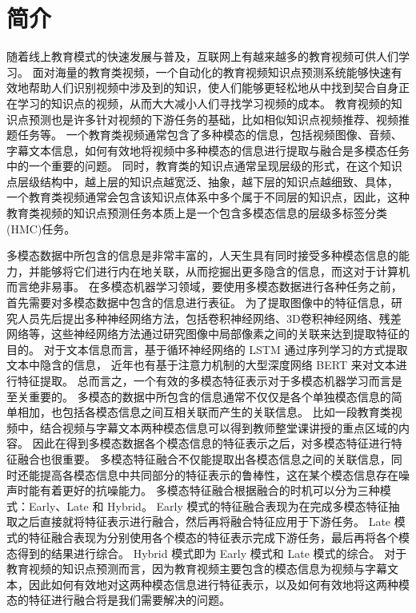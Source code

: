
\chapter{简介}
    随着线上教育模式的快速发展与普及，互联网上有越来越多的教育视频可供人们学习。
    面对海量的教育类视频，一个自动化的教育视频知识点预测系统能够快速有效地帮助人们识别视频中涉及到的知识，使人们能够更轻松地从中找到契合自身正在学习的知识点的视频，从而大大减小人们寻找学习视频的成本。
    教育视频的知识点预测也是许多针对视频的下游任务的基础，比如相似知识点视频推荐、视频推题任务等。
    一个教育类视频通常包含了多种模态的信息，包括视频图像、音频、字幕文本信息，如何有效地将视频中多种模态的信息进行提取与融合是多模态任务中的一个重要的问题。
    同时，教育类的知识点通常呈现层级的形式，在这个知识点层级结构中，越上层的知识点越宽泛、抽象，越下层的知识点越细致、具体，
    一个教育类视频通常会包含该知识点体系中多个属于不同层的知识点，因此，这种教育类视频的知识点预测任务本质上是一个包含多模态信息的层级多标签分类(HMC)任务。

    多模态数据中所包含的信息是非常丰富的，人天生具有同时接受多种模态信息的能力，并能够将它们进行内在地关联，从而挖掘出更多隐含的信息，而这对于计算机而言绝非易事。
    在多模态机器学习领域，要使用多模态数据进行各种任务之前，首先需要对多模态数据中包含的信息进行表征。
    为了提取图像中的特征信息，研究人员先后提出多种神经网络方法，包括卷积神经网络\cite{Krizhevsky2012ImageNetCW}、3D卷积神经网络\cite{Tran2015LearningSF}、残差网络\cite{He2016DeepRL}等，这些神经网络方法通过研究图像中局部像素之间的关联来达到提取特征的目的。
    对于文本信息而言，基于循环神经网络的 LSTM\cite{Hochreiter1997LongSM} 通过序列学习的方式提取文本中隐含的信息，
    近年也有基于注意力机制的大型深度网络 BERT\cite{Devlin2019BERTPO} 来对文本进行特征提取。
    总而言之，一个有效的多模态特征表示对于多模态机器学习而言是至关重要的\cite{Baltruaitis2019MultimodalML}。
    多模态的数据中所包含的信息通常不仅仅是各个单独模态信息的简单相加，也包括各模态信息之间互相关联而产生的关联信息。
    比如一段教育类视频中，结合视频与字幕文本两种模态信息可以得到教师整堂课讲授的重点区域的内容。
    因此在得到多模态数据各个模态信息的特征表示之后，对多模态特征进行特征融合也很重要。
    多模态特征融合不仅能提取出各模态信息之间的关联信息，同时还能提高各模态信息中共同部分的特征表示的鲁棒性\cite{Baltruaitis2019MultimodalML}，这在某个模态信息存在噪声时能有着更好的抗噪能力。
    多模态特征融合根据融合的时机可以分为三种模式：Early、Late 和 Hybrid。
    Early 模式的特征融合表现为在完成多模态特征抽取之后直接就将特征表示进行融合，然后再将融合特征应用于下游任务。
    Late 模式的特征融合表现为分别使用各个模态的特征表示完成下游任务，最后再将各个模态得到的结果进行综合。
    Hybrid 模式即为 Early 模式和 Late 模式的综合。
    对于教育视频的知识点预测而言，因为教育视频主要包含的模态信息为视频与字幕文本，因此如何有效地对这两种模态信息进行特征表示，以及如何有效地将这两种模态的特征进行融合将是我们需要解决的问题。

